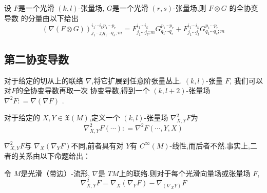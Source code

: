 \documentclass[../../几何与拓扑.tex]{subfiles}
\begin{document}
\begin{proposition}
    设 \(  F  \)是一个光滑 \(  \left( k,l \right)   \)-张量场, \(  G  \)是一个光滑 \(  \left( r,s \right)   \)-张量场,则 \(  F\otimes G  \)     的全协变导数
    的分量由以下给出 \[
    \left(  \nabla \left( F\otimes  G\right)  \right) ^{i_1\cdots i_{k}p_1\cdots p_{r}}_{j_1\cdots j_{l}q_1\cdots q_{s};m} =  F^{i_1\cdots i_{k}}_{j_1\cdots j_{l};m} G^{p_1\cdots p_{r}}_{q_1\cdots q_{s}}+ F^{i_1\cdots i_{k}}_{j_1\cdots j_{l}}G^{p_1\cdots p_{r}}_{q_1\cdots q_{s};m} 
    \]
\end{proposition}

\subsection{第二协变导数}


\begin{definition}
    对于给定的切从上的联络 \(   \nabla   \),将它扩展到任意阶张量丛上.  \(  \left( k,l \right)   \)-张量 \(  F  \),  我们可以对\(  F  \)的全协变导数再取一次
    协变导数,得到一个 \(  \left( k,l+ 2 \right)   \)-张量场 \(   \nabla ^{2}F  : =   \nabla \left(  \nabla F \right) \)   .

    对于给定的 \(  X,Y \in \mathfrak{X}\left( M \right)   \),定义一个 \(  \left( k,l \right)   \)-张量场 \(   \nabla _{X,Y}^{2}F  \)为 \[
     \nabla _{X,Y}^{2}F\left( \cdots  \right): =   \nabla ^{2}F\left( \cdots ,Y,X \right)  
    \]   

\end{definition}

\begin{remark}
     \(   \nabla _{X,Y}^{2}F  \)与 \(   \nabla _{X}\left(  \nabla _{Y}F \right)   \)不同,前者具有对 \(  Y  \)有 \(  C^{\infty}\left( M \right)   \)-线性,而后者不然.事实上,二者的关系由以下命题给出：    
\end{remark}
\begin{proposition}
    令 \(  M  \)是光滑（带边）-流形, \(   \nabla   \)是 \(  TM  \)上的联络.则对于每个光滑向量场或张量场 \(  F  \), \[
     \nabla _{X,Y}^{2}F =   \nabla _{X} \left(  \nabla _{Y}F \right)- \nabla _{\left(  \nabla _{X}Y \right) } F
    \]    
\end{proposition}
\end{document}

